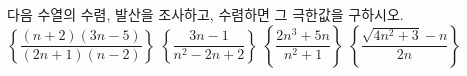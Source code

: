 다음 수열의 수렴, 발산을 조사하고, 수렴하면 그 극한값을 구하시오.
 $\left\{\dfrac{(n+2)(3n-5)}{(2n+1)(n-2)}\right\}$
 $\left\{\dfrac{3n-1}{n^2-2n+2}\right\}$
 $\left\{\dfrac{2n^3+5n}{n^2+1}\right\}$
 $\left\{\dfrac{\sqrt{4n^2+3}-n}{2n}\right\}$
